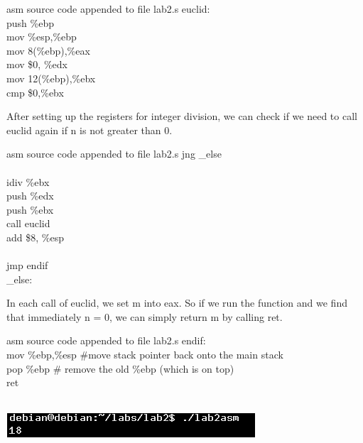 \documentclass{article}
\begin{document}
\begin{GFT}{asm source code appended to file lab2.s}
\+euclid:\\
\+  push \%ebp          \\
\+  mov \%esp,\%ebp  \\
\+   mov 8(\%ebp),\%eax  \\
\+   mov \$0, \%edx      \\
\+   mov 12(\%ebp),\%ebx \\
\+  cmp \$0,\%ebx\\
\end{GFT}
\clearpage
After setting up the registers for integer division, we can check if we need to call euclid again if n is not greater than 0.
\begin{GFT}{asm source code appended to file lab2.s}
\+ jng \_else\\
\+\\
\+   idiv \%ebx \\
\+   push \%edx\\
\+   push \%ebx\\
\+   call euclid\\
\+   add \$8, \%esp\\
\+\\
\+ jmp endif\\
\+\_else: \\
\end{GFT}
In each call of euclid, we set m into eax. So if we run the function and we find that immediately n = 0, we can simply return m by calling ret. 
\begin{GFT}{asm source code appended to file lab2.s}
\+endif:\\
\+  mov \%ebp,\%esp  \#move stack pointer back onto the main stack\\
\+  pop \%ebp     \# remove the old \%ebp (which is on top)\\
\+  ret\\
\+\\
\end{GFT}
\includegraphics{lab2asm.png}
\end{document}
